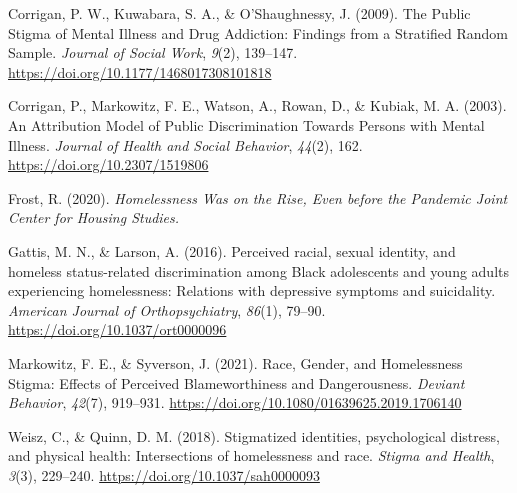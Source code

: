 \documentclass[
  man,
  floatsintext,
  longtable,
  nolmodern,
  notxfonts,
  notimes,
  colorlinks=true,linkcolor=blue,citecolor=blue,urlcolor=blue]{apa7}
\newlength{\cslhangindent}
\newenvironment{CSLReferences}[2] %
 {\begin{list}{}{%
  \setlength{\itemindent}{0pt}
  \setlength{\leftmargin}{0pt}
  \setlength{\parsep}{0pt}
  \ifodd #1
   \setlength{\leftmargin}{\cslhangindent}
   \setlength{\itemindent}{-1\cslhangindent}
  \fi
  \setlength{\itemsep}{#2\baselineskip}}}
 {\end{list}}
\begin{document}
\label{refs}
\begin{CSLReferences}{1}{0}
Corrigan, P. W., Kuwabara, S. A., \& O'Shaughnessy, J. (2009). The
{Public Stigma} of {Mental Illness} and {Drug Addiction}: {Findings}
from a {Stratified Random Sample}. \emph{Journal of Social Work},
\emph{9}(2), 139--147. \url{https://doi.org/10.1177/1468017308101818}

Corrigan, P., Markowitz, F. E., Watson, A., Rowan, D., \& Kubiak, M. A.
(2003). An {Attribution Model} of {Public Discrimination Towards
Persons} with {Mental Illness}. \emph{Journal of Health and Social
Behavior}, \emph{44}(2), 162. \url{https://doi.org/10.2307/1519806}

Frost, R. (2020). \emph{Homelessness {Was} on the {Rise}, {Even} before
the {Pandemic} {\textbar} {Joint Center} for {Housing Studies}.}

Gattis, M. N., \& Larson, A. (2016). Perceived racial, sexual identity,
and homeless status-related discrimination among {Black} adolescents and
young adults experiencing homelessness: {Relations} with depressive
symptoms and suicidality. \emph{American Journal of Orthopsychiatry},
\emph{86}(1), 79--90. \url{https://doi.org/10.1037/ort0000096}

Markowitz, F. E., \& Syverson, J. (2021). Race, {Gender}, and
{Homelessness Stigma}: {Effects} of {Perceived Blameworthiness} and
{Dangerousness}. \emph{Deviant Behavior}, \emph{42}(7), 919--931.
\url{https://doi.org/10.1080/01639625.2019.1706140}

Weisz, C., \& Quinn, D. M. (2018). Stigmatized identities, psychological
distress, and physical health: {Intersections} of homelessness and race.
\emph{Stigma and Health}, \emph{3}(3), 229--240.
\url{https://doi.org/10.1037/sah0000093}

\end{CSLReferences}
\end{document}
